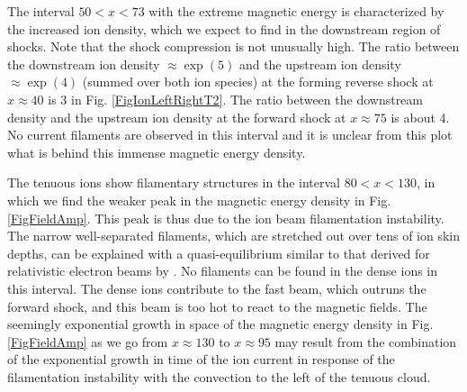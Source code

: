 \documentclass[structabstract]{aa}
\begin{document}
The interval $50<x<73$ with the extreme magnetic energy is characterized by the increased ion density, which 
we expect to find in the downstream region of shocks. Note that the shock compression is not unusually high. 
The ratio between the downstream ion density $\approx \exp{(5)}$ and the upstream ion density $\approx \exp{(4)}$ 
(summed over both ion species) at the forming reverse shock at $x\approx 40$ is 3 in Fig. \ref{FigIonLeftRightT2}. 
The ratio between the downstream density and the upstream ion density at the forward shock at $x\approx 75$ is 
about 4. No current filaments are observed in this interval and it is unclear from this plot what is behind this 
immense magnetic energy density. 

The tenuous ions show filamentary structures in the interval $80 < x < 130$, in which we find the weaker 
peak in the magnetic energy density in Fig. \ref{FigFieldAmp}. This peak is thus due to the ion beam 
filamentation instability. The narrow well-separated filaments, which are stretched out over tens of ion 
skin depths, can be explained with a quasi-equilibrium similar to that derived for relativistic electron 
beams by \citet{Hammer:1970}. No filaments can be found in the dense ions in this interval. The dense ions 
contribute to the fast beam, which outruns the forward shock, and this beam is too hot to react to the 
magnetic fields. The seemingly exponential growth in space of the magnetic energy density in Fig. \ref{FigFieldAmp} 
as we go from $x\approx 130$ to $x\approx 95$ may result from the combination of the exponential growth in time of 
the ion current in response of the filamentation instability with the convection to the left of the tenuous 
cloud.
\end{document}
